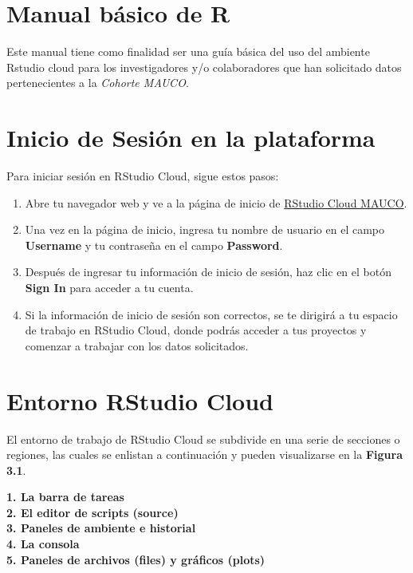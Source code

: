 \documentclass[
]{article}
\author{MAUCO}
\date{2024-04-09}
\begin{document}
{
\setcounter{tocdepth}{2}
\tableofcontents
}
\section{\texorpdfstring{\textbf{Manual básico de
R}}{Manual básico de R}}\label{manual-buxe1sico-de-r}

Este manual tiene como finalidad ser una guía básica del uso del
ambiente Rstudio cloud para los investigadores y/o colaboradores que han
solicitado datos pertenecientes a la \emph{Cohorte MAUCO}.

\section{\texorpdfstring{\textbf{Inicio de Sesión en la
plataforma}}{Inicio de Sesión en la plataforma}}\label{inicio-de-sesiuxf3n-en-la-plataforma}

Para iniciar sesión en RStudio Cloud, sigue estos pasos:

\begin{enumerate}
\def\labelenumi{\arabic{enumi}.}
\item
  Abre tu navegador web y ve a la página de inicio de
  \href{https://rstudio.mauco.org/}{RStudio Cloud MAUCO}.
\item
  Una vez en la página de inicio, ingresa tu nombre de usuario en el
  campo \textbf{Username} y tu contraseña en el campo \textbf{Password}.
\item
  Después de ingresar tu información de inicio de sesión, haz clic en el
  botón \textbf{Sign In} para acceder a tu cuenta.
\item
  Si la información de inicio de sesión son correctos, se te dirigirá a
  tu espacio de trabajo en RStudio Cloud, donde podrás acceder a tus
  proyectos y comenzar a trabajar con los datos solicitados.
\end{enumerate}

\section{\texorpdfstring{\textbf{Entorno RStudio
Cloud}}{Entorno RStudio Cloud}}\label{entorno-rstudio-cloud}

El entorno de trabajo de RStudio Cloud se subdivide en una serie de
secciones o regiones, las cuales se enlistan a continuación y pueden
visualizarse en la \textbf{Figura 3.1}.

\textbf{1. La barra de tareas}\\
\textbf{2. El editor de scripts (source)}\\
\textbf{3. Paneles de ambiente e historial}\\
\textbf{4. La consola}\\
\textbf{5. Paneles de archivos (files) y gráficos (plots)}
\end{document}

